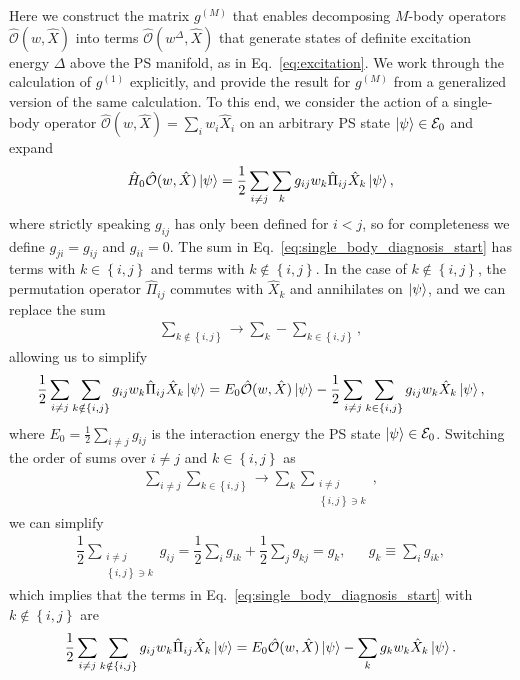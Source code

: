 \documentclass[aps,pra,nofootinbib,twocolumn,superscriptaddress]{revtex4-2}
\newcommand{\f}[2]{\dfrac{#1}{#2}} %
\renewcommand{\set}[1]{\left\{#1\right\}} %
\newcommand{\1}{\mathds{1}}
\renewcommand{\H}{\hat{H}}
\renewcommand{\O}{\hat{\mathcal{O}}}
\newcommand{\E}{\mathcal{E}}
\begin{document}
Here we construct the matrix $g^{(M)}$ that enables decomposing $M$-body operators $\O(w,\hat{X})$ into terms $\O(w^\Delta,\hat{X})$ that generate states of definite excitation energy $\Delta$ above the PS manifold, as in Eq.~\eqref{eq:excitation}.
We work through the calculation of $g^{(1)}$ explicitly, and provide the result for $g^{(M)}$ from a generalized version of the same calculation.
To this end, we consider the action of a single-body operator $\O(w,\hat{X})=\sum_iw_i\hat{X}_i$ on an arbitrary PS state $\ket\psi\in\E_0$ and expand
\begin{align}
  \H_0 \O(w,\hat{X}) \ket\psi
  = \f12 \sum_{i\ne j} \sum_k g_{ij} w_k \hat\Pi_{ij} \hat{X}_k \ket\psi,
  \label{eq:single_body_diagnosis_start}
\end{align}
where strictly speaking $g_{ij}$ has only been defined for $i<j$, so for completeness we define $g_{ji}=g_{ij}$ and $g_{ii}=0$.
The sum in Eq.~\eqref{eq:single_body_diagnosis_start} has terms with $k\in\set{i,j}$ and terms with $k\notin\set{i,j}$.
In the case of $k\notin\set{i,j}$, the permutation operator $\hat\Pi_{ij}$ commutes with $\hat{X}_k$ and annihilates on $\ket\psi$, and we can replace the sum
\begin{align}
  \sum_{k\notin\set{i,j}} \to \sum_k - \sum_{k\in\set{i,j}},
\end{align}
allowing us to simplify
\begin{align}
  \f12 \sum_{i\ne j} \sum_{k\notin\set{i,j}}
  g_{ij} w_k \hat\Pi_{ij} \hat{X}_k \ket\psi
  = E_0 \O(w,\hat{X}) \ket\psi
  - \f12 \sum_{i\ne j} \sum_{k\in\set{i,j}} g_{ij} w_k \hat{X}_k \ket\psi,
\end{align}
where $E_0=\frac12\sum_{i\ne j}g_{ij}$ is the interaction energy the PS state $\ket\psi\in\E_0$.
Switching the order of sums over $i\ne j$ and $k\in\set{i,j}$ as
\begin{align}
  \sum_{i\ne j} \sum_{k\in\set{i,j}}
  \to \sum_k \sum_{\substack{i\ne j\\\set{i,j}\ni k}},
\end{align}
we can simplify
\begin{align}
  \f12 \sum_{\substack{i\ne j\\\set{i,j}\ni k}} g_{ij}
  = \f12 \sum_i g_{ik} + \f12 \sum_j g_{kj}
  = g_k,
  &&
  g_k \equiv \sum_i g_{ik},
\end{align}
which implies that the terms in Eq.~\eqref{eq:single_body_diagnosis_start}
with $k\notin\set{i,j}$ are
\begin{align}
  \f12 \sum_{i\ne j} \sum_{k\notin\set{i,j}}
  g_{ij} w_k \hat\Pi_{ij} \hat{X}_k \ket\psi
  = E_0 \O(w,\hat{X}) \ket\psi - \sum_k g_k w_k \hat{X}_k \ket\psi.
\end{align}
\end{document}
